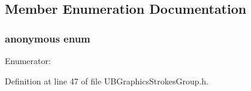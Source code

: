 \subsection{Member Enumeration Documentation}
\hypertarget{class_u_b_graphics_strokes_group_a9881a46b6d4aa934b82ece9ff755ecb8}{\subsubsection[{anonymous enum}]{\setlength{\rightskip}{0pt plus 5cm}anonymous enum}}\label{d3/d0b/class_u_b_graphics_strokes_group_a9881a46b6d4aa934b82ece9ff755ecb8}
\begin{Desc}
\item[Enumerator\-: ]\par
\begin{description}
\item[{\em 
\hypertarget{class_u_b_graphics_strokes_group_a9881a46b6d4aa934b82ece9ff755ecb8acab072a353265ba95c2ddec1598a7802}{Type}\label{d3/d0b/class_u_b_graphics_strokes_group_a9881a46b6d4aa934b82ece9ff755ecb8acab072a353265ba95c2ddec1598a7802}
}]\end{description}
\end{Desc}



Definition at line 47 of file U\-B\-Graphics\-Strokes\-Group.\-h.

